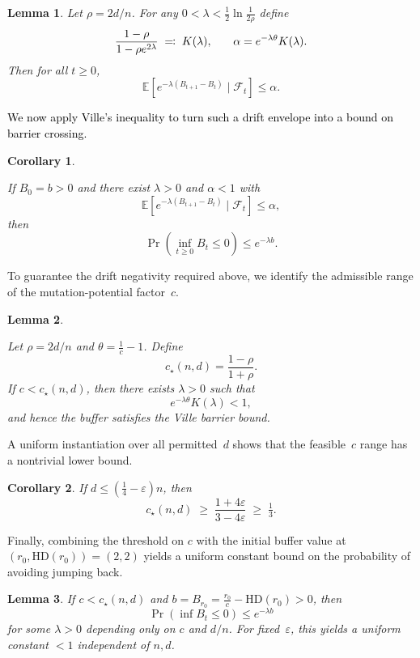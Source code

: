 \documentclass[lettersize,journal]{IEEEtran}
\newcommand{\new}[1]{\textcolor{black}{#1}}
\newcommand{\EE}{\mathbb{E}}
\newtheorem{corollary}{Corollary}
\newtheorem{lemma}{Lemma}
\begin{document}
{\begin{lemma}
\label{lem:drift-envelope-global}
	Let $\rho=2d/n$.  
	For any $0<\lambda<\tfrac12\ln\tfrac{1}{2\rho}$ define
	\[
	\textcolor{black}{\frac{1-\rho}{1-\rho e^{2\lambda}} \;\eqqcolon\; K(\lambda),}
	\qquad 
	\alpha=e^{-\lambda\theta}K(\lambda).
	\]
	Then for all $t\ge0$,
	\[
	\EE[e^{-\lambda(B_{t+1}-B_t)}\mid\mathcal{F}_t]\le \alpha.
	\]
\end{lemma}


\new{We now apply Ville's inequality to turn such a drift envelope into a bound on barrier crossing.}


\begin{corollary}
\label{cor:ville-exponential}
	
	If $B_0=b>0$ and there exist $\lambda>0$ and $\alpha<1$ with
	\[
	\EE[e^{-\lambda(B_{t+1}-B_t)}\mid\mathcal{F}_t]\le\alpha,
	\]
	then
	\[
	\Pr\!\left(\inf_{t\ge0} B_t \le 0\right) \le e^{-\lambda b}.
	\]
\end{corollary}



To guarantee the drift negativity required above, we identify the admissible 
range of the mutation-potential factor~$c$.

\begin{lemma}\label{lem:c-threshold-instance}
	
	Let $\rho=2d/n$ and $\theta=\frac{1}{c}-1$.  
	Define
	\[
	c_\star(n,d)=\frac{1-\rho}{1+\rho}.
	\]
	If $c<c_\star(n,d)$, then there exists $\lambda>0$ such that
	\[
	e^{-\lambda\theta}K(\lambda) < 1,
	\]
	and hence the buffer satisfies the Ville barrier bound.
\end{lemma}


A uniform instantiation over all permitted~$d$ shows that the feasible~$c$ 
range has a nontrivial lower bound.

\begin{corollary}If $d\le (\tfrac14-\varepsilon)n$, then
	\[
	c_\star(n,d) \;\ge\; \frac{1+4\varepsilon}{3-4\varepsilon} \;\ge\; \tfrac13.
	\]
\end{corollary}
\label{cor:c-floor}



Finally, combining the threshold on $c$ with the initial buffer value at 
$(r_0,\mathrm{HD}(r_0))=(2,2)$ yields a uniform constant bound on the 
probability of avoiding jumping back.

\begin{lemma}
\label{lem:param-constant-c-general}
	If $c<c_\star(n,d)$ and 
	$b=B_{r_0}=\frac{r_0}{c}-\mathrm{HD}(r_0)>0$, 
	then 
	\[
	\Pr\!\left(\inf B_t \le 0\right) \le e^{-\lambda b}
	\]
	for some $\lambda>0$ depending only on $c$ and $d/n$.  
	For fixed~$\varepsilon$, this yields a uniform constant $<1$ independent of 
	$n,d$.
\end{lemma}


}
\end{document}

